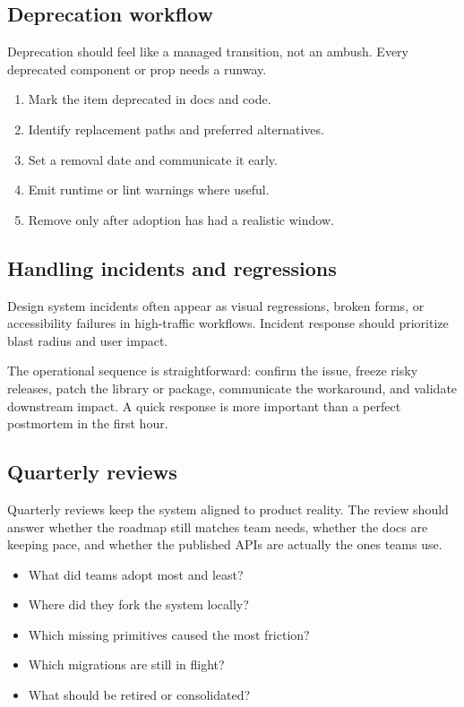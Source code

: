\subsection{Deprecation workflow}
Deprecation should feel like a managed transition, not an ambush. Every deprecated component or prop needs a runway.

\begin{enumerate}[leftmargin=*, itemsep=0.3em]
  \item Mark the item deprecated in docs and code.
  \item Identify replacement paths and preferred alternatives.
  \item Set a removal date and communicate it early.
  \item Emit runtime or lint warnings where useful.
  \item Remove only after adoption has had a realistic window.
\end{enumerate}

\subsection{Handling incidents and regressions}
Design system incidents often appear as visual regressions, broken forms, or accessibility failures in high-traffic workflows. Incident response should prioritize blast radius and user impact.

The operational sequence is straightforward: confirm the issue, freeze risky releases, patch the library or package, communicate the workaround, and validate downstream impact. A quick response is more important than a perfect postmortem in the first hour.

\subsection{Quarterly reviews}
Quarterly reviews keep the system aligned to product reality. The review should answer whether the roadmap still matches team needs, whether the docs are keeping pace, and whether the published APIs are actually the ones teams use.

\begin{itemize}[leftmargin=*, itemsep=0.35em]
  \item What did teams adopt most and least?
  \item Where did they fork the system locally?
  \item Which missing primitives caused the most friction?
  \item Which migrations are still in flight?
  \item What should be retired or consolidated?
\end{itemize}

